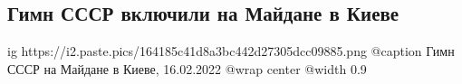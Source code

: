  
 
 
 
 
 
\subsection{Гимн СССР включили на Майдане в Киеве}
\label{sec:16_02_2022.stz.video.youtube.1.gimn_sssr_maidan_rejters}
 

\ifcmt
  ig https://i2.paste.pics/164185c41d8a3bc442d27305dcc09885.png
  @caption Гимн СССР на Майдане в Киеве, 16.02.2022
	@wrap center
	@width 0.9
\fi

